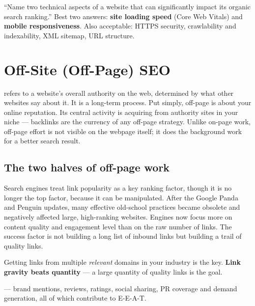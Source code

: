 \begin{exambox}
``Name two technical aspects of a website that can significantly impact its
organic search ranking.''
Best two answers: \textbf{site loading speed} (Core Web Vitals) and
\textbf{mobile responsiveness}. Also acceptable: HTTPS security, crawlability and
indexability, XML sitemap, URL structure.
\end{exambox}

\section{Off-Site (Off-Page) SEO}

\begin{definitionbox}
 refers to a website's overall authority on
the web, determined by what other websites say about it. It is a long-term
process. Put simply, off-page is about your online reputation. Its central
activity is acquiring  from authority sites in
your niche --- backlinks are the currency of any off-page strategy. Unlike
on-page work, off-page effort is not visible on the webpage itself; it does the
background work for a better search result.
\end{definitionbox}

\subsection{The two halves of off-page work}

\noindent{} Search engines treat link popularity as a
key ranking factor, though it is no longer the top factor, because it can be
manipulated. After the Google Panda and Penguin updates, many effective
old-school practices became obsolete and negatively affected large, high-ranking
websites. Engines now focus more on content quality and engagement level than on
the raw number of links. The success factor is not building a long list of
inbound links but building a trail of quality links.

\begin{keybox}
Getting links from multiple \emph{relevant} domains in your industry is the key.
\textbf{Link gravity beats quantity} --- a large quantity of quality links is the
goal.
\end{keybox}

\noindent{} --- brand mentions, reviews, ratings,
social sharing, PR coverage and demand generation, all of which contribute to
E-E-A-T.

